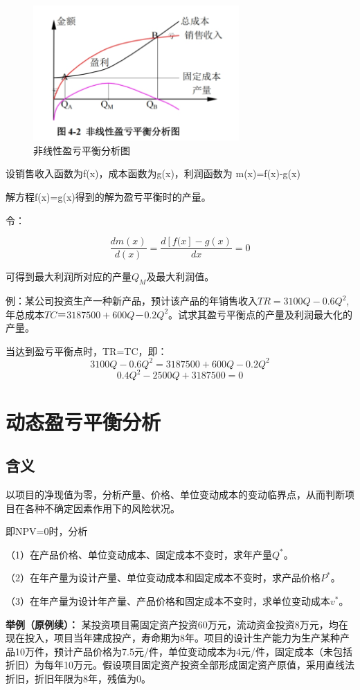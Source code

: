 \begin{figure}[H]
    \centering
    \includegraphics[width=0.7\textwidth]{image/非线性盈亏平衡分析图.png}
    \caption{非线性盈亏平衡分析图}
    \label{fig:23}
\end{figure}

设销售收入函数为f(x)，成本函数为g(x)，利润函数为 m(x)=f(x)-g(x)

解方程f(x)=g(x)得到的解为盈亏平衡时的产量。

令：

$$\frac{dm(x)}{d(x)}=\frac{d[f(x]-g(x)}{dx}=0$$

可得到最大利润所对应的产量$Q_M$及最大利润值。

例：某公司投资生产一种新产品，预计该产品的年销售收入$TR=3100Q-0.6Q^2$,年总成本$TC＝3187500+600Q－0.2Q^2$。试求其盈亏平衡点的产量及利润最大化的产量。

当达到盈亏平衡点时，TR=TC，即：
$$3100Q-0.6Q^2=3187500+600Q-0.2Q^2$$
$$0.4Q^2-2500Q+3187500=0$$

\section{动态盈亏平衡分析}
\subsection{含义}
以项目的净现值为零，分析产量、价格、单位变动成本的变动临界点，从而判断项目在各种不确定因素作用下的风险状况。

即NPV=0时，分析

（1）在产品价格、单位变动成本、固定成本不变时，求年产量$Q^*$。

（2）在年产量为设计产量、单位变动成本和固定成本不变时，求产品价格$P^*$。

（3）在年产量为设计年产量、产品价格和固定成本不变时，求单位变动成本$v^*$。

\textbf{举例（原例续）：}
某投资项目需固定资产投资60万元，流动资金投资8万元，均在现在投入，项目当年建成投产，寿命期为8年。项目的设计生产能力为生产某种产品10万件，预计产品价格为7.5元/件，单位变动成本为4元/件，固定成本（未包括折旧）为每年10万元。假设项目固定资产投资全部形成固定资产原值，采用直线法折旧，折旧年限为8年，残值为0。

